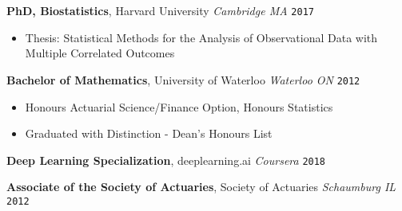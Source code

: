 \documentclass[10pt,english]{report}
\begin{document}
\textbf{PhD, Biostatistics}, Harvard University \hfill \textit{Cambridge MA} \texttt{\quad \phantom{00/0000-00/}2017}
\begin{itemize}
    \item Thesis: Statistical Methods for the Analysis of Observational Data with Multiple Correlated Outcomes
\end{itemize}

\textbf{Bachelor of Mathematics}, University of Waterloo \hfill \textit{Waterloo ON} \texttt{\quad \phantom{00/0000-00/}2012}
\begin{itemize}
    \item Honours Actuarial Science/Finance Option, Honours Statistics
    \item Graduated with Distinction - Dean's Honours List
\end{itemize}

\textbf{Deep Learning Specialization}, deeplearning.ai \hfill \textit{Coursera} \texttt{\quad \phantom{00/0000-00/}2018}

\textbf{Associate of the Society of Actuaries}, Society of Actuaries \hfill \textit{Schaumburg IL} \texttt{\quad \phantom{00/0000-00/}2012}
\end{document}
